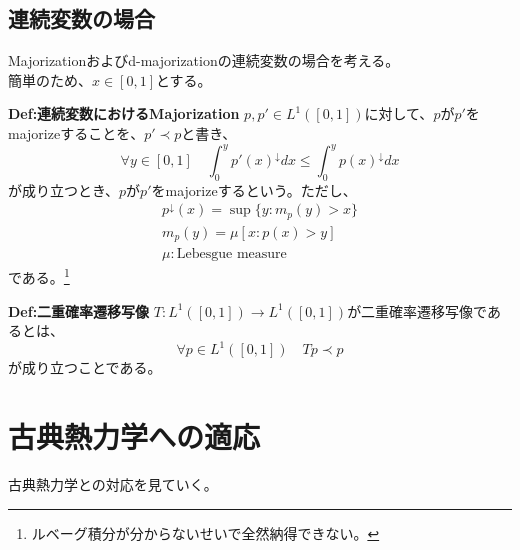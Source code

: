 \documentclass[a4paper,11pt]{jsarticle}
\numberwithin{equation}{section}
\begin{document}
\subsection{連続変数の場合}
Majorizationおよびd-majorizationの連続変数の場合を考える。\\
簡単のため、$x\in[0,1]$とする。

\begin{itembox}[l]{\textbf{Def:連続変数におけるMajorization}}
    $p,p' \in L^1([0,1])$に対して、$p$が$p'$をmajorizeすることを、$p' \prec p$と書き、
    \begin{equation}
        \forall y \in [0,1] \quad \int_{0}^{y}{p'}(x)^{\downarrow}dx \leq \int_{0}^{y}p(x)^{\downarrow}dx
    \end{equation}
    が成り立つとき、$p$が$p'$をmajorizeするという。ただし、
    \begin{align}
        p^{\downarrow}(x) =\sup \{y: m_p(y) >x\}\\
        m_p(y) = \mu[x:p(x)>y]\\
        \mu : \text{Lebesgue measure}
    \end{align}
    である。\footnote[1]{ルベーグ積分が分からないせいで全然納得できない。}
\end{itembox}

\begin{itembox}[l]{\textbf{Def:二重確率遷移写像}}
    $T:L^1([0,1]) \to L^1([0,1])$が二重確率遷移写像であるとは、
    \begin{equation}
        \forall p \in L^1([0,1]) \quad Tp \prec p
    \end{equation}
    が成り立つことである。
\end{itembox}

\newpage
\section{古典熱力学への適応}
古典熱力学との対応を見ていく。
\end{document}

